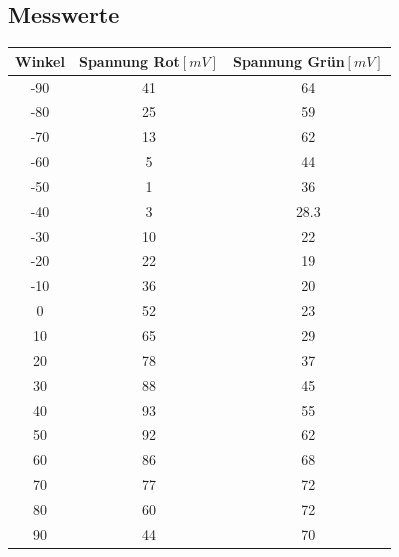 \documentclass{article}
\begin{document}
\subsection{Messwerte}
\begin{tabular}{|c|c|c|}
	\hline 
	\textbf{Winkel}& \textbf{Spannung Rot$[mV]$} &\textbf{Spannung Grün$[mV]$}  \\ 
	\hline 
	-90& 41 & 64 \\ 
	\hline 
	-80& 25 &  59\\ 
	\hline 
	-70& 13 &  62\\ 
	\hline 
	-60&  5& 44 \\ 
	\hline 
	-50& 1 & 36 \\ 
	\hline 
	-40& 3 &  28.3\\ 
	\hline 
	-30&  10&22  \\ 
	\hline 
	-20& 22 & 19 \\ 
	\hline 
	-10& 36 & 20 \\ 
	\hline 
	0& 52 &23  \\ 
	\hline 
	10&  65& 29 \\ 
	\hline 
	20& 78 & 37 \\ 
	\hline 
	30& 88 & 45 \\ 
	\hline 
	40& 93 &  55\\ 
	\hline 
	50&  92&  62\\ 
	\hline 
	60& 86 & 68 \\ 
	\hline 
	70& 77 &  72\\ 
	\hline 
	80&  60& 72 \\ 
	\hline 
	90& 44 &  70\\ 
	\hline 
\end{tabular} 
\
\end{document}
